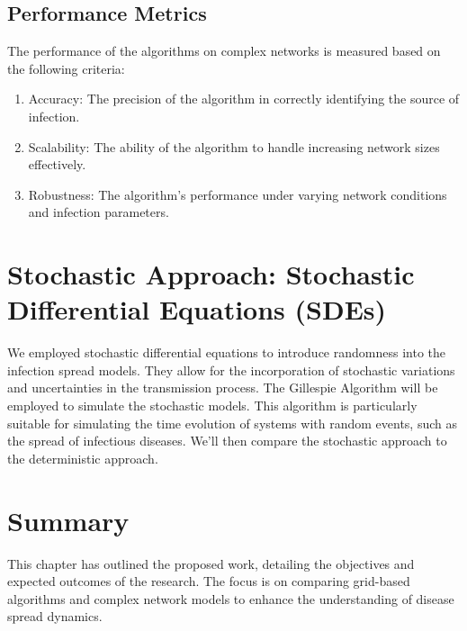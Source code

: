 \subsection{Performance Metrics}
The performance of the algorithms on complex networks is measured based on the following criteria:
\begin{enumerate}
    \item Accuracy: The precision of the algorithm in correctly identifying the source of infection.
    \item Scalability: The ability of the algorithm to handle increasing network sizes effectively.
    \item Robustness: The algorithm's performance under varying network conditions and infection parameters.
\end{enumerate}


\section{Stochastic Approach: Stochastic Differential Equations (SDEs)}
We employed stochastic differential equations to introduce randomness into the infection spread models. They allow for the incorporation of stochastic variations and uncertainties in the transmission process. The Gillespie Algorithm will be employed to simulate the stochastic models. This algorithm is particularly suitable for simulating the time evolution of systems with random events, such as the spread of infectious diseases. We'll then compare the stochastic approach to the deterministic approach.

\section{Summary}
This chapter has outlined the proposed work, detailing the objectives and expected outcomes of the research. The focus is on comparing grid-based algorithms and complex network models to enhance the understanding of disease spread dynamics.